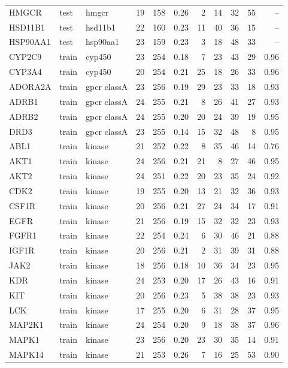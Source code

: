 \begin{longtable}{llp{2.4cm}rrrrrrrr}
HMGCR & test & hmgcr & 19 & 158 & 0.26 & 2 & 14 & 32 & 55 & -- \\
HSD11B1 & test & hsd11b1 & 22 & 160 & 0.23 & 11 & 40 & 36 & 15 & -- \\
HSP90AA1 & test & hsp90aa1 & 23 & 159 & 0.23 & 3 & 18 & 48 & 33 & -- \\
CYP2C9 & train & cyp450 & 23 & 254 & 0.18 & 7 & 23 & 43 & 29 & 0.96 \\
CYP3A4 & train & cyp450 & 20 & 254 & 0.21 & 25 & 18 & 26 & 33 & 0.96 \\
ADORA2A & train & gpcr classA & 23 & 256 & 0.19 & 29 & 23 & 33 & 18 & 0.93 \\
ADRB1 & train & gpcr classA & 24 & 255 & 0.21 & 8 & 26 & 41 & 27 & 0.93 \\
ADRB2 & train & gpcr classA & 24 & 255 & 0.20 & 20 & 24 & 39 & 19 & 0.95 \\
DRD3 & train & gpcr classA & 23 & 255 & 0.14 & 15 & 32 & 48 & 8 & 0.95 \\
ABL1 & train & kinase & 21 & 252 & 0.22 & 8 & 35 & 46 & 14 & 0.76 \\
AKT1 & train & kinase & 24 & 256 & 0.21 & 21 & 8 & 27 & 46 & 0.95 \\
AKT2 & train & kinase & 24 & 251 & 0.22 & 20 & 23 & 35 & 24 & 0.92 \\
CDK2 & train & kinase & 19 & 255 & 0.20 & 13 & 21 & 32 & 36 & 0.93 \\
CSF1R & train & kinase & 20 & 256 & 0.21 & 27 & 24 & 34 & 17 & 0.91 \\
EGFR & train & kinase & 21 & 256 & 0.19 & 15 & 32 & 32 & 23 & 0.93 \\
FGFR1 & train & kinase & 22 & 254 & 0.24 & 6 & 30 & 46 & 21 & 0.88 \\
IGF1R & train & kinase & 20 & 256 & 0.21 & 2 & 31 & 39 & 31 & 0.88 \\
JAK2 & train & kinase & 18 & 256 & 0.18 & 10 & 36 & 34 & 23 & 0.95 \\
KDR & train & kinase & 24 & 253 & 0.20 & 17 & 26 & 43 & 16 & 0.91 \\
KIT & train & kinase & 20 & 256 & 0.23 & 5 & 38 & 38 & 23 & 0.93 \\
LCK & train & kinase & 17 & 255 & 0.20 & 6 & 31 & 28 & 37 & 0.95 \\
MAP2K1 & train & kinase & 24 & 254 & 0.20 & 9 & 18 & 38 & 37 & 0.96 \\
MAPK1 & train & kinase & 23 & 256 & 0.20 & 23 & 30 & 35 & 14 & 0.91 \\
MAPK14 & train & kinase & 21 & 253 & 0.26 & 7 & 16 & 25 & 53 & 0.90 \\

\end{longtable}
